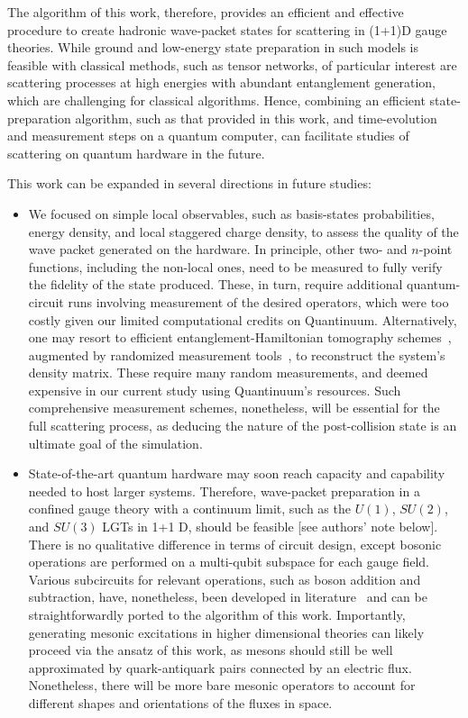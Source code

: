 \documentclass[a4paper,onecolumn,11pt,accepted=2024-10-11]{quantumarticle}
\begin{document}
The algorithm of this work, therefore, provides an efficient and effective procedure to create hadronic wave-packet states for scattering in (1+1)D gauge theories. While ground and low-energy state preparation in such models is feasible with classical methods, such as tensor networks,  of particular interest are scattering processes at high energies with abundant entanglement generation, which are challenging for classical algorithms. Hence, combining an efficient state-preparation algorithm, such as that provided in this work, and time-evolution and measurement steps on a quantum computer, can facilitate studies of scattering on quantum hardware in the future.

This work can be expanded in several directions in future studies:
%
\begin{itemize}
\item[$\diamond$]{
We focused on simple local observables, such as basis-states probabilities, energy density, and local staggered charge density, to assess the quality of the wave packet generated on the hardware. In principle, other two- and $n$-point functions, including the non-local ones, need to be measured to fully verify the fidelity of the state produced. These, in turn, require additional quantum-circuit runs involving measurement of the desired operators, which were too costly given our limited computational credits on Quantinuum. Alternatively, one may resort to efficient entanglement-Hamiltonian tomography schemes~\cite{Kokail:2020opl,Kokail:2021ayb,Joshi:2023rvd,Mueller:2022xbg,Bringewatt:2023xxc}, augmented by randomized measurement tools~\cite{Ohliger_2013,Elben:2019dxb,Huang:2020tih,Vermersch:2023gki,Elben:2022jvo}, to reconstruct the system's density matrix. These require many random measurements, and deemed expensive in our current study using Quantinuum's resources. Such comprehensive measurement schemes, nonetheless, will be essential for the full scattering process, as deducing the nature of the post-collision state is an ultimate goal of the simulation.}
%
\item[$\diamond$]{State-of-the-art quantum hardware may soon reach capacity and capability needed to host larger systems. Therefore, wave-packet preparation in a confined gauge theory with a continuum limit, such as the $U(1)$, $SU(2)$, and $SU(3)$ LGTs in 1+1 D, should be feasible [see authors' note below]. There is no qualitative difference in terms of circuit design, except bosonic operations are performed on a multi-qubit subspace for each gauge field. Various subcircuits for relevant operations, such as boson addition and subtraction, have, nonetheless, been developed in literature~\cite{Shaw:2020udc,Davoudi:2022xmb} and can be straightforwardly ported to the algorithm of this work. Importantly, generating mesonic excitations in higher dimensional theories can likely proceed via the ansatz of this work, as mesons should still be well approximated by quark-antiquark pairs connected by an electric flux. Nonetheless, there will be more bare mesonic operators to account for different shapes and orientations of the fluxes in space.}

\end{itemize}
\end{document}
